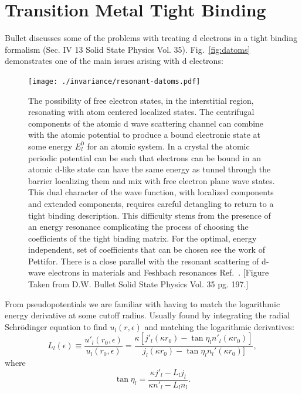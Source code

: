 \section{Transition Metal Tight Binding}
\label{sec:tmtb}
Bullet discusses some of the problems with treating d electrons in a tight binding 
formalism (Sec. IV 13 Solid State Physics Vol. 35). Fig.~\ref{fig:datoms} demonstrates
one of the main issues arising with d electrons:
%
\begin{figure}
\texttt{[image: ./invariance/resonant-datoms.pdf]}
\caption{The possibility of free electron states, in the interstitial region, 
resonating with atom centered localized states. The centrifugal components of the 
atomic d wave scattering channel can combine with
the atomic potential to produce a bound electronic state at some energy $E^{0}_{l}$ for an atomic system.
In a crystal the atomic periodic potential can be such that electrons can be bound in an
atomic d-like state can have the same energy as tunnel through the barrier localizing 
them and mix with free electron plane wave states. This dual character of the wave 
function, with localized components and extended components, requires careful 
detangling to return to a tight binding description. This difficulty 
stems from the presence of an energy resonance 
complicating the process of choosing the coefficients of the tight binding matrix. 
For the optimal, energy independent, set of coefficients that can be 
chosen see the work of Pettifor. There is a close parallel with the resonant
scattering of d-wave electrons in materials and Feshbach resonances Ref.~\cite{chin10}.
[Figure Taken from D.W. Bullet Solid State Physics Vol. 35 pg. 197.]}
\end{figure}
%

From pseudopotentials we are familiar with having to match the logarithmic energy
derivative at some cutoff radius. Usually found by integrating the radial
Schr\"odinger equation to find $u_{l}(r,\epsilon)$ and matching the logarithmic derivatives:
%
\begin{equation}
L_{l}(\epsilon) \equiv \frac{u'_{l}(r_{0},\epsilon)}{u_{l}(r_{0},\epsilon)} = \frac{\kappa[j'_{l}
(\kappa r_{0}) - \tan \eta_{l} n'_{l}(\kappa r_{0})]} {j_{l}(\kappa r_{0}) - \tan \eta_{l} n_{l}'(\kappa r_{0})]},
\end{equation}
%
where
%
\begin{equation}
\label{eq:phaseshift}
\tan \eta_{l} = \frac{\kappa j'_{l} - L_{l}j_{l}}{\kappa n'_{l} - L_{l}n_{l}}.
\end{equation}

